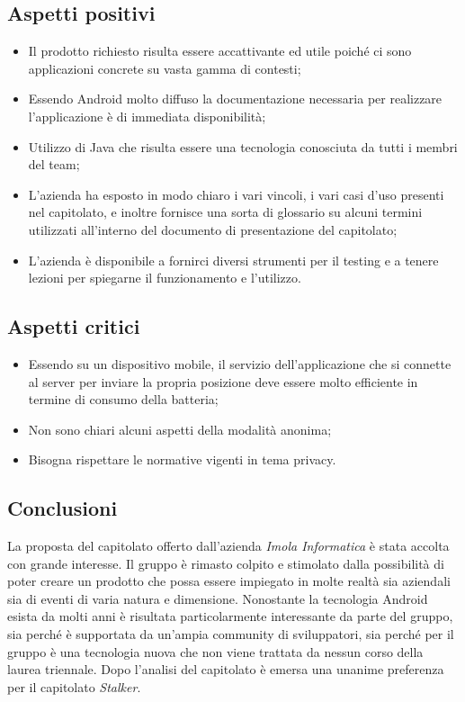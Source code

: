 \subsection{Aspetti positivi}
\begin{itemize}
\item Il prodotto richiesto risulta essere accattivante ed utile poich\'e ci sono applicazioni concrete su vasta gamma di contesti;
\item Essendo Android molto diffuso la documentazione necessaria per realizzare l'applicazione \`e di immediata disponibilit\`a;
\item Utilizzo di Java che risulta essere una tecnologia conosciuta da tutti i membri del team;
\item L'azienda ha esposto in modo chiaro i vari vincoli, i vari casi d'uso presenti nel capitolato, e inoltre fornisce una sorta di glossario su alcuni termini utilizzati all'interno del documento di presentazione del capitolato;
\item L'azienda \`e disponibile a fornirci diversi strumenti per il testing e a tenere lezioni per spiegarne il funzionamento e l'utilizzo.
\end{itemize}
\subsection{Aspetti critici}
\begin{itemize}
\item Essendo su un dispositivo mobile, il servizio dell'applicazione che si connette al server per inviare la propria posizione deve essere molto efficiente in termine di consumo della batteria;
\item Non sono chiari alcuni aspetti della modalit\`a anonima;
\item Bisogna rispettare le normative vigenti in tema privacy.
\end{itemize}
\subsection{Conclusioni}
La proposta del capitolato offerto dall'azienda \textit{Imola Informatica} \`e stata accolta con grande interesse. Il gruppo \`e rimasto colpito e stimolato dalla possibilit\`a di poter creare un prodotto che possa essere impiegato in molte realt\`a sia aziendali sia di eventi di varia natura e dimensione. 
Nonostante la tecnologia Android esista da molti anni è risultata particolarmente interessante da parte del gruppo, sia perché è supportata da un'ampia community di sviluppatori, sia perché per il gruppo è una tecnologia nuova che non viene trattata da nessun corso della laurea triennale. Dopo l'analisi del capitolato è emersa una unanime preferenza per il capitolato \textit{Stalker}.